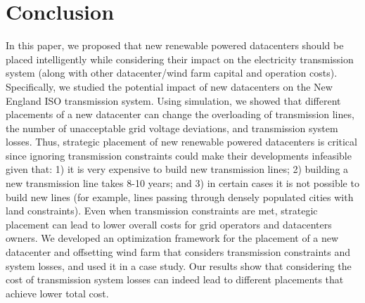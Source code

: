 \section{Conclusion}
\label{sec:conclusion}

In this paper, we proposed that new renewable powered datacenters
should be placed intelligently while considering their impact on the
electricity transmission system (along with other datacenter/wind farm
capital and operation costs).  Specifically, we studied the potential
impact of new datacenters on the New England ISO transmission system.
Using simulation, we showed that different placements of a new
datacenter can change the overloading of transmission lines, the
number of unacceptable grid voltage deviations, and transmission
system losses.  Thus, strategic placement of new renewable powered
datacenters is critical since ignoring transmission constraints could
make their developments infeasible given that: 1) it is very expensive to
build new transmission lines; 2) building a new transmission line
takes 8-10 years; and 3) in certain cases it is not possible to build
new lines (for example, lines passing through densely populated cities
with land constraints).  Even when transmission constraints are met,
strategic placement can lead to lower overall costs for grid operators
and datacenters owners.  We developed an optimization framework for
the placement of a new datacenter and offsetting wind farm that
considers transmission constraints and system losses, and used it in a
case study.  Our results show that considering the cost of
transmission system losses can indeed lead to different placements
that achieve lower total cost.

